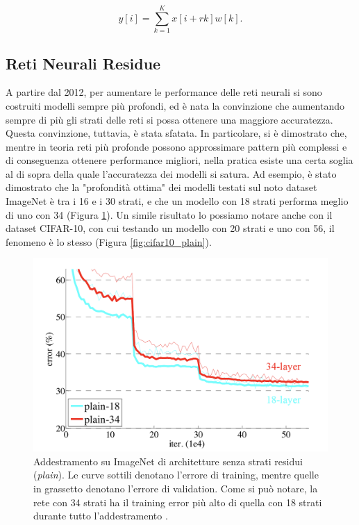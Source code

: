 \begin{equation}
    y[i] = \sum_{k=1}^{K}{x[i+rk]w[k]}.
\end{equation}




\subsection{Reti Neurali Residue}
A partire dal 2012, per aumentare le performance delle reti neurali si sono costruiti modelli sempre più profondi, ed è nata la convinzione che aumentando sempre di più gli strati delle reti si possa ottenere una maggiore accuratezza. Questa convinzione, tuttavia, è stata sfatata. In particolare, si è dimostrato che, mentre in teoria reti più profonde possono approssimare pattern più complessi e di conseguenza ottenere performance migliori, nella pratica esiste una certa soglia al di sopra della quale l'accuratezza dei modelli si satura. Ad esempio, è stato dimostrato che la "profondità ottima" dei modelli testati sul noto dataset ImageNet è tra i 16 e i 30 strati, e che un modello con 18 strati performa meglio di uno con 34 (Figura \ref{fig:imagenet_plainet}). Un simile risultato lo possiamo notare anche con il dataset CIFAR-10, con cui testando un modello con 20 strati e uno con 56, il fenomeno è lo stesso (Figura \ref{fig:cifar10_plain}).



\begin{figure}[h!]
    \centering
    \hspace*{0in}
    \includegraphics[scale=0.5]{img/imagenet_plainnet.png}
    \caption{Addestramento su ImageNet di architetture senza strati residui (\textit{plain}). Le curve sottili denotano l'errore di training, mentre quelle in grassetto denotano l'errore di validation. Come si può notare, la rete con 34 strati ha il training error più alto di quella con 18 strati durante tutto l'addestramento \cite{resnets}.}
    \label{fig:imagenet_plainet}
\end{figure}


